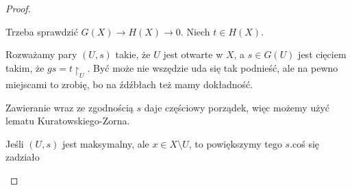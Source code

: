 \begin{proof}
\begin{enumerate}
\begin{enumerate}
          Trzeba sprawdzić $G(X)\to H(X)\to 0$. Niech $t\in H(X)$.

          Rozważamy pary $(U, s)$ takie, że $U$ jest otwarte w $X$, a $s\in G(U)$ jest cięciem takim, że $gs=t\restriction _U$. Być może nie wszędzie uda się tak podnieść, ale na pewno miejscami to zrobię, bo na źdźbłach też mamy dokładność.

          Zawieranie wraz ze zgodnością $s$ daje częściowy porządek, więc możemy użyć lematu Kuratowskiego-Zorna.

          Jeśli $(U, s)$ jest maksymalny, ale $x\in X\setminus U$, to powiększymy tego $s$.{\large\color{red}coś się zadziało}
      \end{enumerate}
  \end{enumerate}
\end{proof}
